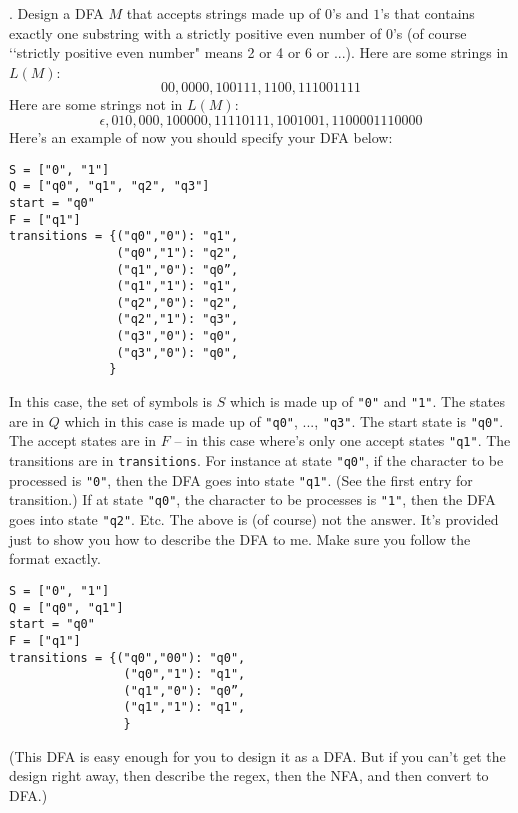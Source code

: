 

\renewcommand\AUTHOR{nweadick1@cougars.ccis.edu} %


\topmattertwo


\nextq
\tf.
Design a DFA $M$ that accepts strings made up of $0$'s and $1$'s
that contains exactly one substring with a strictly positive even number of $0$'s
(of course \lq\lq strictly positive even number" means 2 or 4 or 6 or ...).
Here are some strings in $L(M)$:
\[
00, 0000, 100111, 1100, 111001111
\]
Here are some strings not in $L(M)$:
\[
\epsilon, 010, 000, 100000, 11110111, 1001001, 1100001110000
\]
Here's an example of now you should specify your DFA below:
\begin{Verbatim}[frame=single,fontsize=\small]
S = ["0", "1"]
Q = ["q0", "q1", "q2", "q3"]
start = "q0"
F = ["q1"]
transitions = {("q0","0"): "q1",
               ("q0","1"): "q2",
               ("q1","0"): "q0”,
               ("q1","1"): "q1",
               ("q2","0"): "q2",
               ("q2","1"): "q3",
               ("q3","0"): "q0",
               ("q3","0"): "q0",
              }
\end{Verbatim}
In this case, the set of symbols is $S$
which is made up of \verb!"0"! and \verb!"1"!.
The states are in $Q$ which in this case is made up of
\verb!"q0"!, ..., \verb!"q3"!.
The start state is \verb!"q0"!.
The accept states are in $F$ – in this case where's only one accept states
\verb!"q1"!.
The transitions are in \verb!transitions!.
For instance at state \verb!"q0"!,
if the character to be processed is \verb!"0"!,
then the DFA goes into state \verb!"q1"!.
(See the first entry for transition.)
If at state \verb!"q0"!, the character to be processes is \verb!"1"!,
then the DFA goes into state \verb!"q2"!. Etc.
The above is (of course) not the answer.
It's provided just to show you how to describe the DFA to me.
Make sure you follow the format exactly. 

\ANSWER
\begin{Verbatim}[frame=single,fontsize=\small]
S = ["0", "1"]
Q = ["q0", "q1"]
start = "q0"
F = ["q1"]
transitions = {("q0","00"): "q0",
                ("q0","1"): "q1",
                ("q1","0"): "q0”,
                ("q1","1"): "q1",
                }
\end{Verbatim}

(This DFA is easy enough for you to design it as a DFA.
But if you can't get the design right away, then describe the
regex, then the NFA, and then convert to DFA.)

\newpage


